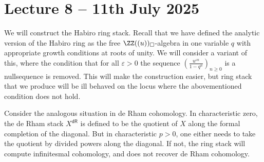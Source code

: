 \section{Lecture 8 -- 11th July 2025}\label{sec: lecture 8}
We will construct the Habiro ring stack. Recall that we have defined the analytic version of the Habiro ring  as the free $\ZZ((u))_{\square}$-algebra in one variable $q$ with appropriate growth conditions at roots of unity. We will consider a variant of this, where the condition that for all $\varepsilon>0$ the sequence $\left(\frac{u^{\varepsilon n}}{1-q^{n}}\right)_{n\geq0}$ is a nullsequence is removed. This will make the construction easier, but ring stack that we produce will be ill behaved on the locus where the abovementioned condition does not hold. 

Consider the analogous situation in de Rham cohomology. In characteristic zero, the de Rham stack $X^{\mathsf{dR}}$ is defined to be the quotient of $X$ along the formal completion of the diagonal. But in characteristic $p>0$, one either needs to take the quotient by divided powers along the diagonal. If not, the ring stack will compute infinitesmal cohomology, and does not recover de Rham cohomology.

